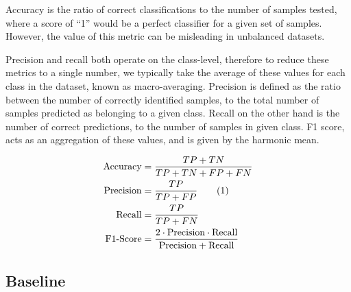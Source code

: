 \documentclass[conference,compsoc]{IEEEtran}
\begin{document}
Accuracy is the ratio of correct classifications to the number of samples tested, where a score of ``1'' would be a perfect classifier for a given set of samples. However, the value of this metric can be misleading in unbalanced datasets. 

Precision and recall both operate on the class-level, therefore to reduce these metrics to a single number, we typically take the average of these values for each class in the dataset, known as macro-averaging. Precision is defined as the ratio between the number of correctly identified samples, to the total number of samples predicted as belonging to a given class. Recall on the other hand is the number of correct predictions, to the number of samples in given class. F1 score, acts as an aggregation of these values, and is given by the harmonic mean.

\begin{align}
    \text{Accuracy} &= \frac{TP + TN}{TP + TN + FP + FN}\nonumber\\
    \text{Precision} &= \frac{TP}{TP + FP} \refstepcounter{equation} \tag{\theequation}\label{eq:metrics}\\
    \text{Recall} &= \frac{TP}{TP + FN}\nonumber\\ 
    \text{F1-Score} &=  \frac{2 \cdot \text{Precision} \cdot \text{Recall}}{\text{Precision} + \text{Recall}}\nonumber
\end{align}


\subsection{Baseline}
\end{document}
